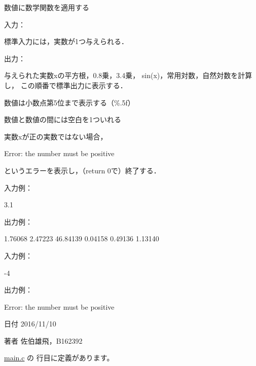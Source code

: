 数値に数学関数を適用する 

入力：
\begin{DoxyItemize}
\item 標準入力には，実数が1つ与えられる．
\end{DoxyItemize}

出力：
\begin{DoxyItemize}
\item 与えられた実数xの平方根，0.8乗，3.4乗， sin(x)，常用対数，自然対数を計算し， この順番で標準出力に表示する．
\item 数値は小数点第5位まで表示する（\%.5f）
\item 数値と数値の間には空白を1ついれる
\item 実数xが正の実数ではない場合， \begin{DoxyVerb}Error: the number must be positive
\end{DoxyVerb}
 というエラーを表示し，（return 0で）終了する．
\end{DoxyItemize}

入力例： \begin{DoxyVerb}3.1
\end{DoxyVerb}
 出力例： \begin{DoxyVerb}1.76068 2.47223 46.84139 0.04158 0.49136 1.13140
\end{DoxyVerb}
 入力例： \begin{DoxyVerb}-4
\end{DoxyVerb}
 出力例： \begin{DoxyVerb}Error: the number must be positive
\end{DoxyVerb}
 \begin{DoxyDate}{日付}
2016/11/10 
\end{DoxyDate}
\begin{DoxyAuthor}{著者}
佐伯雄飛，\-B162392 
\end{DoxyAuthor}


 \hyperlink{main_8c_source}{main.\-c} の  行目に定義があります。


